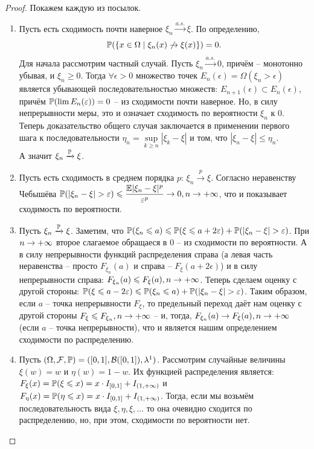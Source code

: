 \begin{proof}
    Покажем каждую из посылок.
    \begin{enumerate}
        \item Пусть есть сходимость почти наверное $\xi_n \xrightarrow{a.s.} \xi$. По определению, \[\P(\{x \in \Omega \mid \xi_n(x) \not\ra \xi(x)\}) = 0.\]
        Для начала рассмотрим частный случай. Пусть $\xi_n \xrightarrow{a.s.} 0$, причём -- монотонно убывая, и $\xi_n \geq 0$. Тогда $\forall \epsilon > 0$ множество точек $E_n(\epsilon) = \Omega(\xi_n > \epsilon)$ является убывающей последовательностью множеств: $E_{n + 1}(\epsilon) \subset E_{n}(\epsilon)$, причём $\P(\lim E_n(\epsilon)) = 0$ -- из сходимости почти наверное. Но, в силу непрерывности меры, это и означает сходимость по вероятности $\xi_n$ к 0.
        Теперь доказательство общего случая заключается в применении первого шага к последовательности $\eta_n = \sup\limits_{k \geq n}|\xi_k - \xi|$ и том, что $|\xi_n - \xi| \leq \eta_n$. \\
        А значит $\xi_n \xrightarrow{\P} \xi$.
        \item Пусть есть сходимость в среднем порядка $p$: $\xi_n \xrightarrow{p} \xi$. Согласно неравенству Чебышёва $\P(|\xi_n - \xi| > \epsilon) \leq \dfrac{\Ex|\xi_n - \xi|^p}{\epsilon^p} \ra 0, n \ra +\infty$, что и показывает сходимость по вероятности.
        \item Пусть $\xi_n \xrightarrow{\P} \xi$. Заметим, что $\P(\xi_n \leq a) \leq \P(\xi \leq a + 2\epsilon) + \P(|\xi_n - \xi| > \epsilon)$.
        При $n \ra +\infty$ второе слагаемое обращаеся в 0 -- из сходимости по вероятности. А в силу непрерывности функций распределения справа (а левая часть неравенства -- просто $F_{\xi_n}(a)$ и справа -- $F_{\xi}(a + 2\epsilon)$) и в силу непрерывности справа: $F_{\xi_n}(a) \leq F_{\xi}(a), n \ra +\infty$.
        Теперь сделаем оценку с другой стороны: $\P(\xi \leq a - 2\epsilon) \leq \P(\xi_n \leq a) + \P(|\xi_n - \xi| > \epsilon)$. Таким образом, если $a$ -- точка непрерывности $F_{\xi}$, то предельный переход даёт нам оценку с другой стороны $F_{\xi} \leq F_{\xi_n}, n \ra +\infty$ -- и, тогда, $F_{\xi_n}(a) \ra F_{\xi}(a), n \ra +\infty$ (если $a$ -- точка непрерывности), что и является нашим определением сходимости по распределению.
        \item Пусть $(\Omega, \mathcal{F}, \P) = ([0, 1], \mathcal{B}([0, 1]), \lambda^1)$. Рассмотрим случайные величины $\xi(w) = w$ и $\eta(w) = 1 - w$. Их функцией распределения является: $F_{\xi}(x) = \P(\xi \leq x) = x \cdot I_{[0, 1]} + I_{(1, +\infty)}$ и $F_{\eta}(x) = \P(\eta \leq x) = x \cdot I_{[0, 1]} + I_{(1, +\infty)}$. Тогда, если мы возьмём последовательность вида $\xi, \eta, \xi, \ldots$ то она очевидно сходится по распределению, но, при этом, сходимости по вероятности нет.

\end{enumerate}
\end{proof}
